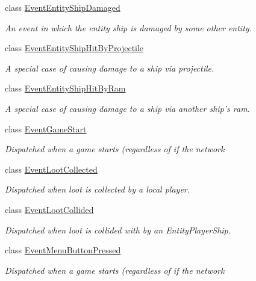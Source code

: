 \begin{DoxyCompactItemize}
class \hyperlink{class_skyrates_1_1_game_1_1_event_1_1_event_entity_ship_damaged}{Event\-Entity\-Ship\-Damaged}
\begin{DoxyCompactList}\small\item\em An event in which the entity ship is damaged by some other entity. \end{DoxyCompactList}\item 
class \hyperlink{class_skyrates_1_1_game_1_1_event_1_1_event_entity_ship_hit_by_projectile}{Event\-Entity\-Ship\-Hit\-By\-Projectile}
\begin{DoxyCompactList}\small\item\em A special case of causing damage to a ship via projectile. \end{DoxyCompactList}\item 
class \hyperlink{class_skyrates_1_1_game_1_1_event_1_1_event_entity_ship_hit_by_ram}{Event\-Entity\-Ship\-Hit\-By\-Ram}
\begin{DoxyCompactList}\small\item\em A special case of causing damage to a ship via another ship's ram. \end{DoxyCompactList}\item 
class \hyperlink{class_skyrates_1_1_game_1_1_event_1_1_event_game_start}{Event\-Game\-Start}
\begin{DoxyCompactList}\small\item\em Dispatched when a game starts (regardless of if the network \end{DoxyCompactList}\item 
class \hyperlink{class_skyrates_1_1_game_1_1_event_1_1_event_loot_collected}{Event\-Loot\-Collected}
\begin{DoxyCompactList}\small\item\em Dispatched when loot is collected by a local player. \end{DoxyCompactList}\item 
class \hyperlink{class_skyrates_1_1_game_1_1_event_1_1_event_loot_collided}{Event\-Loot\-Collided}
\begin{DoxyCompactList}\small\item\em Dispatched when loot is collided with by an Entity\-Player\-Ship. \end{DoxyCompactList}\item 
class \hyperlink{class_skyrates_1_1_game_1_1_event_1_1_event_menu_button_pressed}{Event\-Menu\-Button\-Pressed}
\begin{DoxyCompactList}\small\item\em Dispatched when a game starts (regardless of if the network \end{DoxyCompactList}\item 

\end{DoxyCompactItemize}
